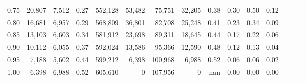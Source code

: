 \begin{tabular}{rrrrrrrrrrrrrrr}
0.75 &  20,807 &  7,512 &  0.27 &  552,128 &   53,482 &   75,751 &   32,205 &  0.38 &  0.30 &  0.50 &      0.12 \\
0.80 &  16,681 &  6,957 &  0.29 &  568,809 &   36,801 &   82,708 &   25,248 &  0.41 &  0.23 &  0.34 &      0.09 \\
0.85 &  13,103 &  6,603 &  0.34 &  581,912 &   23,698 &   89,311 &   18,645 &  0.44 &  0.17 &  0.22 &      0.06 \\
0.90 &  10,112 &  6,055 &  0.37 &  592,024 &   13,586 &   95,366 &   12,590 &  0.48 &  0.12 &  0.13 &      0.04 \\
0.95 &   7,188 &  5,602 &  0.44 &  599,212 &    6,398 &  100,968 &    6,988 &  0.52 &  0.06 &  0.06 &      0.02 \\
1.00 &   6,398 &  6,988 &  0.52 &  605,610 &        0 &  107,956 &        0 &   nan &  0.00 &  0.00 &      0.00 \\
\bottomrule
\end{tabular}

